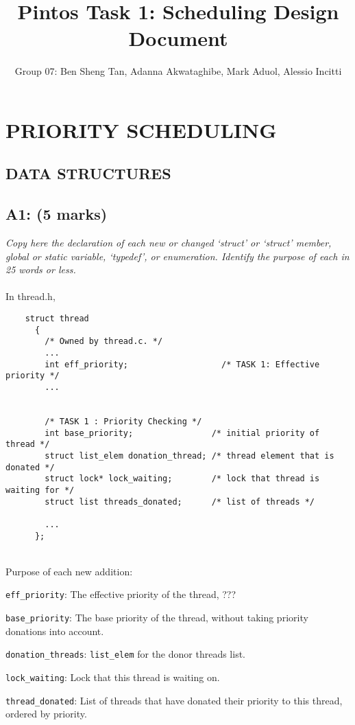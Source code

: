 \documentclass{article}
\title{Pintos Task 1: Scheduling Design Document}
\author{Group 07: Ben Sheng Tan, Adanna Akwataghibe, Mark Aduol, Alessio Incitti }
\begin{document}
\maketitle

\section{PRIORITY SCHEDULING}

\subsection{ DATA STRUCTURES}

\subsection*{A1: (5 marks) }

\textit{Copy here the declaration of each new or changed ‘struct’ or ‘struct’ member, global or static variable, ‘typedef’, or enumeration. Identify the purpose of each in 25 words or less.}
\\ \\
In thread.h,
\begin{lstlisting}
    struct thread
      {
        /* Owned by thread.c. */
        ...
        int eff_priority;                   /* TASK 1: Effective priority */
        ...


        /* TASK 1 : Priority Checking */
        int base_priority;                /* initial priority of thread */
        struct list_elem donation_thread; /* thread element that is donated */
        struct lock* lock_waiting;        /* lock that thread is waiting for */
        struct list threads_donated;      /* list of threads */

        ...
      };

\end{lstlisting}
\\
Purpose of each new addition:

\texttt{eff\_priority}: The effective priority of the thread, ???

\texttt{base\_priority}: The base priority of the thread, without taking priority donations into account.

\texttt{donation\_threads}: \texttt{list\_elem} for the donor threads list.

\texttt{lock\_waiting}: Lock that this thread is waiting on.

\texttt{thread\_donated}:  List of threads that have donated their priority to this thread, ordered by priority.
\end{document}

